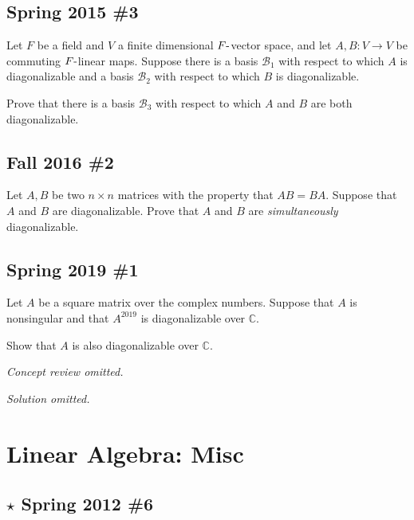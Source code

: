 \hypertarget{spring-2015-3}{%
\subsection{Spring 2015 \#3}\label{spring-2015-3}}

Let \(F\) be a field and \(V\) a finite dimensional
\(F{\hbox{-}}\)vector space, and let \(A, B: V\to V\) be commuting
\(F{\hbox{-}}\)linear maps. Suppose there is a basis \({\mathcal{B}}_1\)
with respect to which \(A\) is diagonalizable and a basis
\({\mathcal{B}}_2\) with respect to which \(B\) is diagonalizable.

Prove that there is a basis \({\mathcal{B}}_3\) with respect to which
\(A\) and \(B\) are both diagonalizable.

\hypertarget{fall-2016-2}{%
\subsection{Fall 2016 \#2}\label{fall-2016-2}}

Let \(A, B\) be two \(n\times n\) matrices with the property that
\(AB = BA\). Suppose that \(A\) and \(B\) are diagonalizable. Prove that
\(A\) and \(B\) are \emph{simultaneously} diagonalizable.

\hypertarget{spring-2019-1}{%
\subsection{Spring 2019 \#1}\label{spring-2019-1}}

Let \(A\) be a square matrix over the complex numbers. Suppose that
\(A\) is nonsingular and that \(A^{2019}\) is diagonalizable over
\({\mathbb{C}}\).

Show that \(A\) is also diagonalizable over \({\mathbb{C}}\).

\emph{Concept review omitted.}

\emph{Solution omitted.}

\hypertarget{linear-algebra-misc}{%
\section{Linear Algebra: Misc}\label{linear-algebra-misc}}

\hypertarget{star-spring-2012-6}{%
\subsection{\texorpdfstring{\(\star\) Spring 2012
\#6}{\textbackslash star Spring 2012 \#6}}\label{star-spring-2012-6}}

